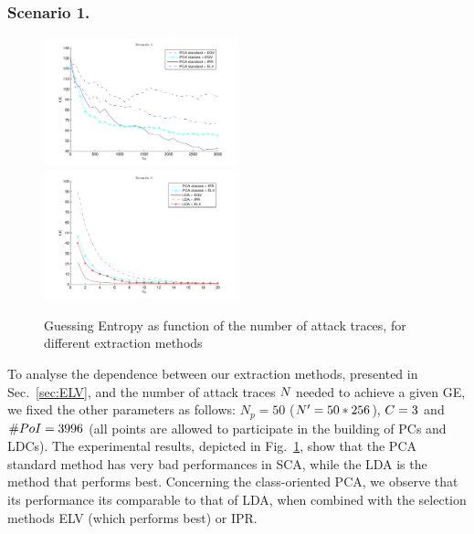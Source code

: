 \subsubsection{Scenario 1.}
\begin{figure}
\includegraphics[width=0.5\textwidth]{figures/Criterion1.pdf}
\includegraphics[width=0.5\textwidth]{figures/Criterion1Good.pdf} 
\caption{Guessing Entropy as function of the number of attack traces, for different extraction methods}\label{fig:1}
\end{figure}
To analyse the dependence between our extraction methods, presented in Sec.~\ref{sec:ELV}, and the number of attack traces $\numTraces[]$ needed to achieve a given GE, we fixed the other parameters as follows: $N_p=50$ ($\numTraces[]'=50*256$), $\newTraceLength = 3$ and $\numPoI = 3996$ (all points are allowed to participate in the building of PCs and LDCs). The experimental results, depicted in Fig.~\ref{fig:1}, show that the PCA standard method has very bad performances in SCA, while the LDA is the method that performs best. Concerning the class-oriented PCA, we observe that its performance its comparable to that of LDA, when combined with the selection methods ELV (which performs best) or IPR.  \\


